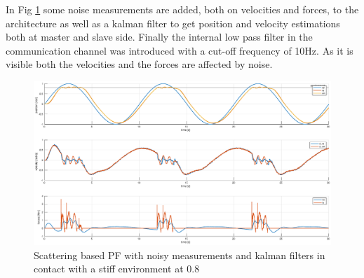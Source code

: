 \documentclass[a4paper,12pt]{article}
\begin{document}
In Fig \ref{fig:scat_pf_contact_kalman} some noise measurements are added, both on velocities and forces, to the architecture as well as a kalman filter to get position and velocity estimations both at master and slave side. Finally the internal low pass filter in the communication channel was introduced with a cut-off frequency of 10Hz. As it is visible both the velocities and the forces are affected by noise.

\begin{figure}[H]
    \begin{center}
        \hspace*{-4.5cm}
        \includegraphics[scale=0.5]{images/scatt_pf_contact_kalman.eps}
    \end{center}
    \caption{Scattering based PF with noisy measurements and kalman filters in contact with a stiff environment at 0.8}
    \label{fig:scat_pf_contact_kalman}
\end{figure}
\end{document}
